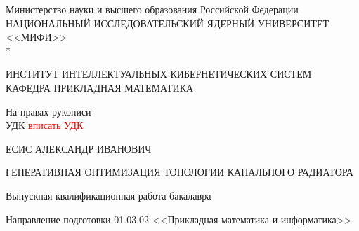 \documentclass[a4paper,12pt]{extreport}
\numberwithin{equation}{chapter}
\begin{document}
\renewcommand{\contentsname}{\Large Содержание}
\renewcommand{\bibname}{\normalfont\Large\bfseries Список литературы}
\renewcommand{\figurename}{\normalfont Рис.\!}

\begin{titlepage}
    \begin{center}
        Министерство науки и высшего образования Российской Федерации \\
        НАЦИОНАЛЬНЫЙ ИССЛЕДОВАТЕЛЬСКИЙ ЯДЕРНЫЙ УНИВЕРСИТЕТ <<МИФИ>> \\*
        \hrulefill
    \end{center}

    \begin{center}
        ИНСТИТУТ ИНТЕЛЛЕКТУАЛЬНЫХ КИБЕРНЕТИЧЕСКИХ СИСТЕМ\\
        КАФЕДРА  ПРИКЛАДНАЯ МАТЕМАТИКА
    \end{center}
    \vspace{1cm}

    \begin{flushright}
        На правах рукописи\\
        УДК \underline{\textcolor{red}{вписать УДК}}
    \end{flushright}

    \vspace{0.5em}

    \begin{center}
        ЕСИС АЛЕКСАНДР ИВАНОВИЧ
    \end{center}

    \vspace{1em}

    \begin{center}
        \large ГЕНЕРАТИВНАЯ ОПТИМИЗАЦИЯ ТОПОЛОГИИ КАНАЛЬНОГО РАДИАТОРА
    \end{center}

    \vspace{2em}

    \begin{center}
        \large{Выпускная квалификационная работа бакалавра}
    \end{center}

    \vspace{1em}

    \begin{center}
        Направление подготовки 01.03.02 <<Прикладная математика и информатика>>
    \end{center}

    \vspace{2.5em}


\end{titlepage}
\end{document}

